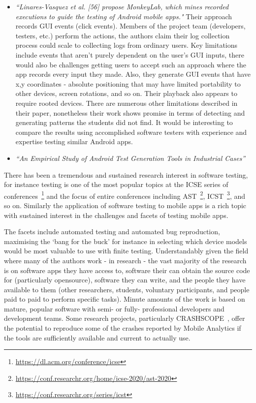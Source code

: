 \begin{itemize}
    \item \emph{``Linares-Vasquez et al. [56] propose MonkeyLab, which mines recorded executions to guide the testing of Android mobile apps."} Their approach records GUI events (click events). Members of the project team (developers, testers, etc.) perform the actions, the authors claim their log collection process could scale to collecting logs from ordinary users. Key limitations include events that aren't purely dependent on the user's GUI inputs, there would also be challenges getting users to accept such an approach where the app records every input they made. Also, they generate GUI events that have x,y coordinates - absolute positioning that may have limited portability to other devices, screen rotations, and so on. Their playback also appears to require rooted devices. There are numerous other limitations described in their paper, nonetheless their work shows promise in terms of detecting and generating patterns the students did not find. It would be interesting to compare the results using accomplished software testers with experience and expertise testing similar Android apps.
    
    \item \emph{``An Empirical Study of Android Test Generation Tools in Industrial Cases''}~\cite{wang2018_an_empirical_study_of_android_test_generation_tools_in_industrial_cases} 
\end{itemize}

There has been a tremendous and sustained research interest in software testing, for instance testing is one of the most popular topics at the ICSE series of conferences~\footnote{\url{https://dl.acm.org/conference/icse}} and the focus of entire conferences including AST~\footnote{\url{https://conf.researchr.org/home/icse-2020/ast-2020}}, ICST~\footnote{\url{https://conf.researchr.org/series/icst}}, and so on. Similarly the application of software testing to mobile apps is a rich topic with sustained interest in the challenges and facets of testing mobile apps.

The facets include automated testing and automated bug reproduction, maximising the `bang for the buck' for instance in selecting which device models would be most valuable to use with finite testing. Understandably given the field where many of the authors work - in research - the vast majority of the research is on software apps they have access to, software their can obtain the source code for (particularly opensource), software they can write, and the people they have available to them (other researchers, students, voluntary participants, and people paid to paid to perform specific tasks). Minute amounts of the work is based on mature, popular software with semi- or fully- professional developers and development teams. Some research projects, particularly CRASHSCOPE~, offer the potential to reproduce some of the crashes reported by Mobile Analytics if the tools are sufficiently available and current to actually use.





